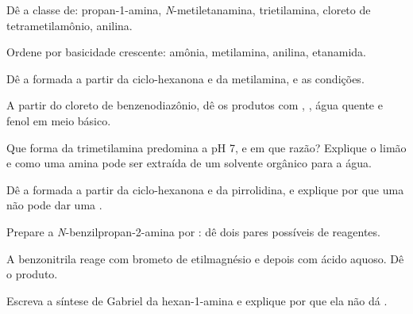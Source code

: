 \begin{exercise}[$\star$]\label{exo:b2:amines:1}
Dê a classe de: propan-1-amina, \textit{N}-metiletanamina, trietilamina,
cloreto de tetrametilamônio, anilina.
\end{exercise}

\begin{exercise}[$\star$]\label{exo:b2:amines:2}
Ordene por basicidade crescente: amônia, metilamina, anilina, etanamida.
\end{exercise}

\begin{exercise}[$\star$]\label{exo:b2:amines:3}
Dê a  formada a partir da ciclo-hexanona e da metilamina, e as condições.
\end{exercise}

\begin{exercise}[$\star$]\label{exo:b2:amines:4}
A partir do cloreto de benzenodiazônio, dê os produtos com , ,
água quente e fenol em meio básico.
\end{exercise}

\begin{exercise}[$\star\star$]\label{exo:b2:amines:5}
Que forma da trimetilamina predomina a pH 7, e em que razão? Explique o limão e
como uma amina pode ser extraída de um solvente orgânico para a água.
\end{exercise}

\begin{exercise}[$\star\star$]\label{exo:b2:amines:6}
Dê a  formada a partir da ciclo-hexanona e da pirrolidina, e explique
por que uma  não pode dar uma .
\end{exercise}

\begin{exercise}[$\star\star$]\label{exo:b2:amines:7}
Prepare a \textit{N}-benzilpropan-2-amina  por : dê dois pares possíveis de reagentes.
\end{exercise}

\begin{exercise}[$\star\star$]\label{exo:b2:amines:8}
A benzonitrila reage com brometo de etilmagnésio e depois com ácido aquoso. Dê o produto.
\end{exercise}

\begin{exercise}[$\star\star$]\label{exo:b2:amines:9}
Escreva a síntese de Gabriel da hexan-1-amina e explique por que ela não dá .
\end{exercise}

